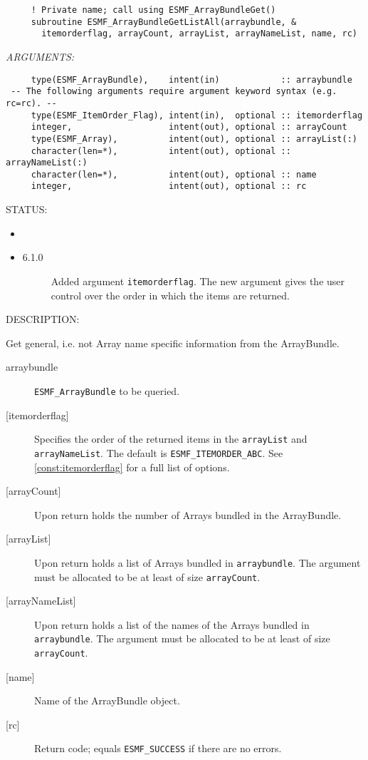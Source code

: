   
\begin{verbatim}     ! Private name; call using ESMF_ArrayBundleGet()   
     subroutine ESMF_ArrayBundleGetListAll(arraybundle, &
       itemorderflag, arrayCount, arrayList, arrayNameList, name, rc)\end{verbatim}{\em ARGUMENTS:}
\begin{verbatim}     type(ESMF_ArrayBundle),    intent(in)            :: arraybundle
 -- The following arguments require argument keyword syntax (e.g. rc=rc). --
     type(ESMF_ItemOrder_Flag), intent(in),  optional :: itemorderflag
     integer,                   intent(out), optional :: arrayCount
     type(ESMF_Array),          intent(out), optional :: arrayList(:)
     character(len=*),          intent(out), optional :: arrayNameList(:)
     character(len=*),          intent(out), optional :: name
     integer,                   intent(out), optional :: rc\end{verbatim}
{\sf STATUS:}
   \begin{itemize}
   \item{}
   \item{}
   \begin{description}
   \item[6.1.0] Added argument {\tt itemorderflag}.
                The new argument gives the user control over the order in which
                the items are returned.
   \end{description}
   \end{itemize}
  
{\sf DESCRIPTION:\\ }


     Get general, i.e. not Array name specific information from the ArrayBundle.
  
     \begin{description}
     \item [arraybundle]
       {\tt ESMF\_ArrayBundle} to be queried.
     \item[{[itemorderflag]}]
       Specifies the order of the returned items in the {\tt arrayList} and
       {\tt arrayNameList}.
       The default is {\tt ESMF\_ITEMORDER\_ABC}.
       See \ref{const:itemorderflag} for a full list of options.
     \item [{[arrayCount]}]
       Upon return holds the number of Arrays bundled in the ArrayBundle.
     \item [{[arrayList]}]
       Upon return holds a list of Arrays bundled in {\tt arraybundle}. The
       argument must be allocated to be at least of size {\tt arrayCount}.
     \item [{[arrayNameList]}]
       Upon return holds a list of the names of the Arrays bundled in 
       {\tt arraybundle}. The argument must be allocated to be at least of
       size {\tt arrayCount}.
     \item [{[name]}]
       Name of the ArrayBundle object.
     \item [{[rc]}]
       Return code; equals {\tt ESMF\_SUCCESS} if there are no errors.
     \end{description}
   
